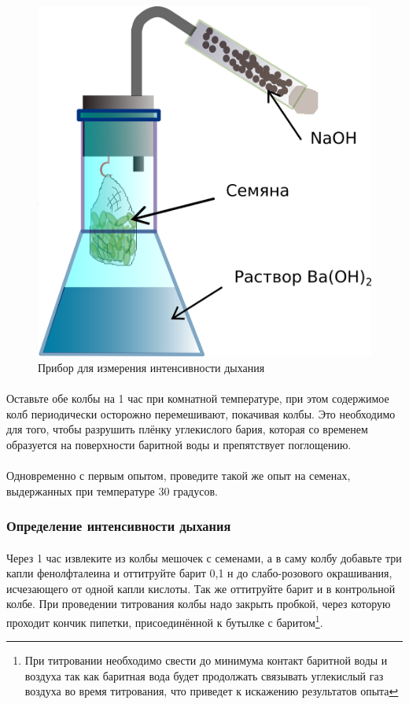\begin{figure}
  \centering
       \includegraphics[width=0.5\linewidth]{pictures/breazing_colba}
\caption{Прибор для измерения интенсивности дыхания}
\label{breazing_colba}
\end{figure}

\paragraph*{}Оставьте обе колбы на 1 час при комнатной температуре, при этом содержимое колб периодически осторожно перемешивают, покачивая колбы. Это необходимо для того, чтобы разрушить плёнку углекислого бария, которая со временем образуется на поверхности баритной воды и препятствует поглощению.

\paragraph*{}Одновременно с первым опытом, проведите такой же опыт на семенах, выдержанных при температуре 30 градусов. 

\subsubsection{Определение интенсивности дыхания}

\paragraph*{}Через 1 час извлеките из колбы мешочек с семенами, а в саму колбу добавьте три капли фенолфталеина и оттитруйте барит 0,1 н до слабо-розового окрашивания, исчезающего от одной капли кислоты. Так же оттитруйте барит и в контрольной колбе. При проведении титрования колбы надо закрыть пробкой, через которую проходит кончик пипетки, присоединённой к бутылке с баритом\footnote{При титровании необходимо свести до минимума контакт баритной воды и воздуха так как баритная вода будет продолжать связывать углекислый газ воздуха во время титрования, что приведет к искажению результатов опыта}.

